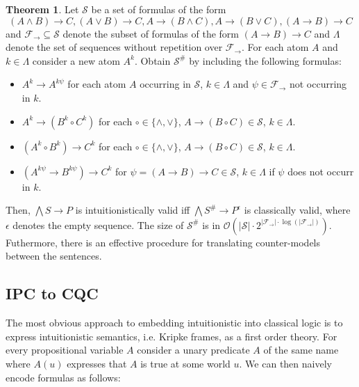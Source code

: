 \documentclass[a4paper,11pt]{report}
\theoremstyle{definition}
\newtheorem{theorem}{Theorem}[section]
\theoremstyle{definition}
\theoremstyle{definition}
\theoremstyle{definition}
\theoremstyle{definition}
\theoremstyle{definition}
\theoremstyle{definition}
\begin{document}
	\begin{theorem}
		Let $\mathcal S$ be a set of formulas of the form
		$$(A\wedge B)\to C, (A\vee B)\to C, A\to (B\wedge C), A\to(B\vee C), (A\to B)\to C$$
		and $\mathcal F_\to\subseteq\mathcal S$ denote the subset of formulas of the form $(A\to B)\to C$ and $\Lambda$ denote the set of sequences without repetition over $\mathcal F_\to$. For each atom $A$ and $k\in\Lambda$ consider a new atom $A^k$. Obtain $\mathcal S^\#$ by including the following formulas:
		\begin{itemize}
			\item $A^k\to A^{k\psi}$ for each atom $A$ occurring in $\mathcal S$, $k\in\Lambda$ and $\psi\in\mathcal F_\to$ not occurring in $k$.
			\item $A^k\to (B^k\circ C^k)$ for each $\circ\in\{\wedge,\vee\}$, $A\to (B\circ C)\in\mathcal S$, $k\in\Lambda$.
			\item $(A^k\circ B^k)\to C^k$ for each $\circ\in\{\wedge,\vee\}$, $A\to (B\circ C)\in\mathcal S$, $k\in\Lambda$.
			\item $(A^{k\psi}\to B^{k\psi})\to C^k$ for $\psi = (A\to B)\to C\in\mathcal S$, $k\in\Lambda$ if $\psi$ does not occurr in $k$.
		\end{itemize}
		Then, $\bigwedge S\to P$ is intuitionistically valid iff $\bigwedge S^\#\to P^\epsilon$ is classically valid, where $\epsilon$ denotes the empty sequence. The size of $\mathcal S^\#$ is in $\mathcal O(|\mathcal S|\cdot2^{|\mathcal F_\to|\cdot\log(|\mathcal F_\to|)})$. Futhermore, there is an effective procedure for translating counter-models between the sentences.
	\end{theorem}
	
	\subsection{IPC to CQC}
	
	The most obvious approach to embedding intuitionistic into classical logic is to express intuitionistic semantics, i.e. Kripke frames, as a first order theory. For every propositional variable $A$ consider a unary predicate $A$ of the same name where $A(u)$ expresses that $A$ is true at some world $u$. We can then naively encode formulas as follows:
	
\end{document}
